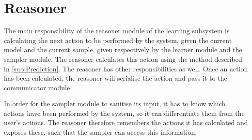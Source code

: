\section{Reasoner}\label{sec:Reasoner}
The main responsibility of the reasoner module of the learning subsystem is calculating the next action to be performed by the system, given the current model and the current sample, given respectively by the learner module and the sampler module.
The reasoner calculates this action using the method described in \cref{sub:Prediction}.
The reasoner has other responsibilities as well. Once an action has been calculated, the reasoner will serialise the action and pass it to the communicator module.

In order for the sampler module to sanitise its input, it has to know which actions have been performed by the system, so it can differentiate them from the user's actions. The reasoner therefore remembers the actions it has calculated and exposes these, such that the sampler can access this information.
